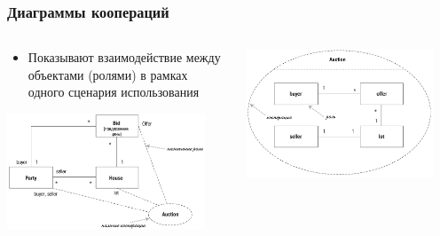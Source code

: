 \documentclass{../../slides-style}
\begin{document}
    \begin{frame}
        \frametitle{Диаграммы коопераций}
        \begin{columns}
            \begin{column}{0.5\textwidth}
                \begin{itemize}
                    \item Показывают взаимодействие между объектами (ролями) в рамках одного сценария использования
                \end{itemize}
                \vspace{3mm}
                \begin{center}
                    \includegraphics[width=0.9\textwidth]{cooperationAlternateNotation.png}
                \end{center}
            \end{column}
            \begin{column}{0.5\textwidth}
                \begin{center}
                    \includegraphics[width=0.9\textwidth]{cooperationDiagram.png}
                \end{center}
            \end{column}
        \end{columns}
    \end{frame}
\end{document}
